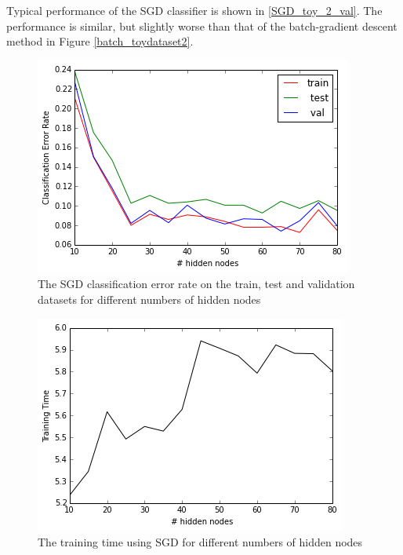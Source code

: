 \documentclass[10pt]{article}
\begin{document}
Typical performance of the SGD classifier is shown in \ref{SGD_toy_2_val}. The performance is similar, but slightly worse than that of the batch-gradient descent method in Figure \ref{batch_toydataset2}.
%
\begin{figure}
\centering
\includegraphics[scale=0.5]{SGD_toy_data_2_CER.png}
\caption{The SGD classification error rate on the train, test and validation datasets for different numbers of hidden nodes}
\label{SGD_toy_data_2_CER}
\end{figure}
%
\begin{figure}
\centering
\includegraphics[scale=0.5]{SGD_toy_data_2_training_time.png}
\caption{The training time using SGD for different numbers of hidden nodes}
\label{SGD_toy_data_2_training_time}
\end{figure}
\end{document}
